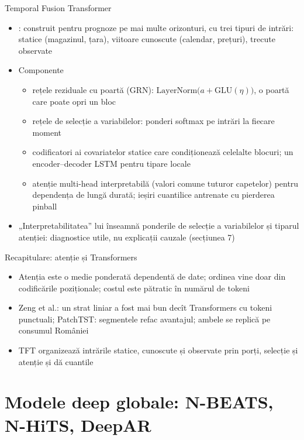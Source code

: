 \begin{frame}{Temporal Fusion Transformer}
\itemsize{\small}
\begin{itemize}
    \item {}: construit pentru prognoze pe mai multe orizonturi, cu trei tipuri de intrări: statice (magazinul, țara), viitoare cunoscute (calendar, prețuri), trecute observate
    \item Componente
    \begin{itemize}
        \item rețele reziduale cu poartă (GRN): $\mathrm{LayerNorm}\big(a + \mathrm{GLU}(\eta)\big)$, o poartă care poate opri un bloc
        \item rețele de selecție a variabilelor: ponderi softmax pe intrări la fiecare moment
        \item codificatori ai covariatelor statice care condiționează celelalte blocuri; un encoder--decoder LSTM pentru tipare locale
        \item atenție multi-head interpretabilă (valori comune tuturor capetelor) pentru dependența de lungă durată; ieșiri cuantilice antrenate cu pierderea pinball
    \end{itemize}
    \item „Interpretabilitatea” lui înseamnă ponderile de selecție a variabilelor și tiparul atenției: diagnostice utile, nu explicații cauzale (secțiunea 7)
\end{itemize}
\end{frame}

\begin{frame}{Recapitulare: atenție și Transformers}
\itemsize{\small}
\begin{itemize}
    \item Atenția este o medie ponderată dependentă de date; ordinea vine doar din codificările poziționale; costul este pătratic în numărul de tokeni
    \item Zeng et al.: un strat liniar a fost mai bun decît Transformers cu tokeni punctuali; PatchTST: segmentele refac avantajul; ambele se replică pe consumul României
    \item TFT organizează intrările statice, cunoscute și observate prin porți, selecție și atenție și dă cuantile
\end{itemize}
\end{frame}


\section{Modele deep globale: N-BEATS, N-HiTS, DeepAR}

